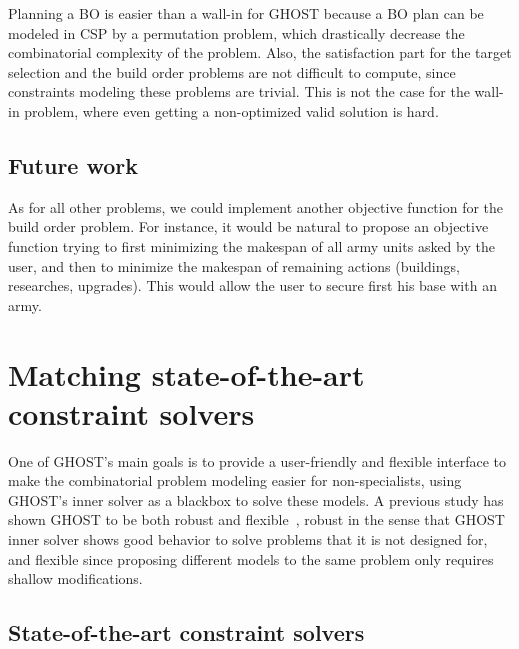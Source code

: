 \documentclass[journal]{IEEEtran}
\newcommand{\csp}{\textsc{CSP}\xspace}
\newcommand{\ghost}{\textsc{GHOST}\xspace}
\begin{document}
Planning a BO is easier than a wall-in for \ghost because a BO plan can be modeled in \csp by a
permutation  problem,  which  drastically decrease  the  combinatorial
complexity of the problem.
Also,  the satisfaction part for the target
selection and the  build order problems are not  difficult to compute,
since constraints  modeling these problems  are trivial.  This  is not
the case for  the wall-in problem, where even  getting a non-optimized
valid solution is hard.

\subsection{Future work}

As  for  all other  problems,  we  could implement  another  objective
function  for the  build  order  problem. For  instance,  it would  be
natural to  propose an objective  function trying to  first minimizing
the makespan of all army units asked by the user, and then to minimize
the   makespan   of    remaining   actions   (buildings,   researches,
upgrades). This would allow the user  to secure first his base with an
army.



\section{Matching state-of-the-art constraint solvers}\label{sec:SOTA}

One  of \ghost's  main goals  is  to provide  a user-friendly and  flexible
interface   to  make  the  combinatorial   problem  modeling  easier for
non-specialists, using \ghost's inner solver as a blackbox to solve
these models. A previous study has  shown \ghost to be both robust and
flexible~\cite{aiide15_rts},  robust in  the sense  that \ghost  inner
solver shows good  behavior to solve problems that it is  not designed for,
and flexible since proposing different models to the same problem only
requires shallow modifications.

\subsection{State-of-the-art constraint solvers}
\end{document}
